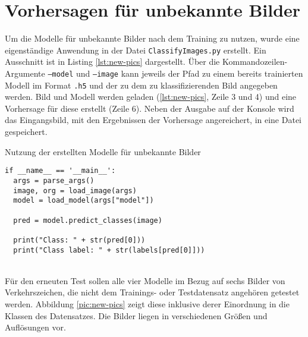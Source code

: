 \section{Vorhersagen für unbekannte Bilder}
Um die Modelle für unbekannte Bilder nach dem Training zu nutzen, wurde eine eigenständige Anwendung in der Datei \texttt{ClassifyImages.py} erstellt. Ein Ausschnitt ist in Listing \ref{lst:new-pics} dargestellt. Über die Kommandozeilen-Argumente \texttt{--model} und \texttt{--image} kann jeweils der Pfad zu einem bereits trainierten Modell im Format \texttt{.h5} und der zu dem zu klassifizierenden Bild angegeben werden. Bild und Modell werden geladen (\ref{lst:new-pics}, Zeile 3 und 4) und eine Vorhersage für diese erstellt (Zeile 6). Neben der Ausgabe auf der Konsole wird das Eingangsbild, mit den Ergebnissen der Vorhersage angereichert, in eine Datei gespeichert.

\begin{listing} [ht]
	\caption{Nutzung der erstellten Modelle für unbekannte Bilder}
	\label{lst:new-pics}
	\begin{verbatim}
if __name__ == '__main__':
  args = parse_args()
  image, org = load_image(args)
  model = load_model(args["model"])

  pred = model.predict_classes(image)

  print("Class: " + str(pred[0]))
  print("Class label: " + str(labels[pred[0]]))
	\end{verbatim}
\end{listing} \ \\
%
Für den erneuten Test sollen alle vier Modelle im Bezug auf sechs Bilder von Verkehrszeichen, die nicht dem Trainings- oder Testdatensatz angehören getestet werden. Abbildung \ref{pic:new-pics} zeigt diese inklusive derer Einordnung in die Klassen des Datensatzes. Die Bilder liegen in verschiedenen Größen und Auflösungen vor. 

